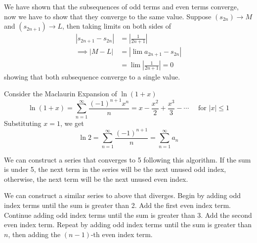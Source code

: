 {{{            We have shown that the subsequences of odd terms and even terms converge, now we have to show that they converge to the same value. Suppose $(s_{2n}) \rightarrow M$ and $(s_{2n+1}) \rightarrow L$, then taking limits on both sides of 
            \begin{align*}
            |s_{2n+1} - s_{2n}| &= \left| \frac1{2n+1} \right| \\
            \implies |M - L| &= \left| \lim a_{2n+1} - s_{2n} \right| \\
            &=  \lim \left| \frac{1}{2n+1} \right| = 0
            \end{align*}
            showing that both subsequence converge to a single value.

            \item Consider the Maclaurin Expansion of $\ln (1+x)$ 
            \[
            \ln (1+x) = \sum_{n=1}^\infty \frac{(-1)^{n+1} x^n}{n} = x - \frac{x^2}2 + \frac{x^3}3 - \cdots \quad \text{ for } |x| \le 1
            \] 
            Substituting $x = 1$, we get 
            \[
            \ln 2 = \sum_{n=1}^\infty \frac{(-1)^{n+1}}n = \sum_{n=1}^\infty a_n
            \]

            \item We can construct a series that converges to 5 following this algorithm. If the sum is under 5, the next term in the series will be the next unused odd index, otherwise, the next term will be the next unused even index.
            \item We can construct a similar series to above that diverges. Begin by adding odd index terms until the sum is greater than 2. Add the first even index term. Continue adding odd index terms until the sum is greater than 3. Add the second even index term. Repeat by adding odd index terms until the sum is greater than $n$, then adding the $(n-1)$-th even index term.
        }
    }
}

